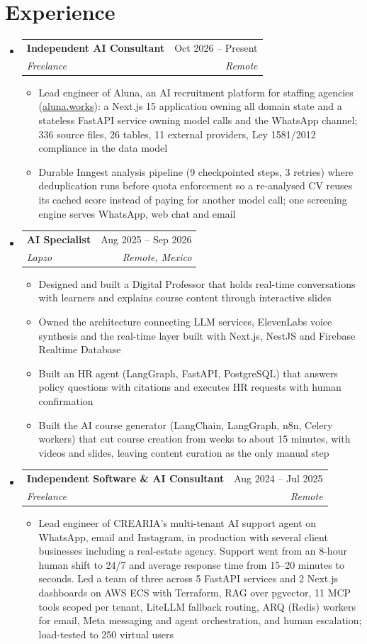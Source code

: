 \documentclass[letterpaper,10pt]{article}
\makeatletter
\newcommand{\resumeSubheading}[4]{
  \vspace{-2pt}
  \item[]
  \begin{tabular*}{\textwidth}{@{\extracolsep{\fill}}l r}
    \textbf{#1} & #2 \\
    \textit{#3} & \textit{#4} \\
  \end{tabular*}
  \vspace{-5pt}
}
\makeatother
\begin{document}
\section{Experience}
\begin{itemize}[leftmargin=0pt, itemindent=0pt, label={}, itemsep=1pt]
\resumeSubheading
{Independent AI Consultant}{Oct 2026 -- Present}
{Freelance}{Remote}
\begin{itemize}[leftmargin=*, itemsep=0pt]
    \item Lead engineer of Aluna, an AI recruitment platform for staffing agencies (\href{https://www.aluna.works}{aluna.works}): a Next.js 15 application owning all domain state and a stateless FastAPI service owning model calls and the WhatsApp channel; 336 source files, 26 tables, 11 external providers, Ley 1581/2012 compliance in the data model
    \item Durable Inngest analysis pipeline (9 checkpointed steps, 3 retries) where deduplication runs before quota enforcement so a re-analysed CV reuses its cached score instead of paying for another model call; one screening engine serves WhatsApp, web chat and email
\end{itemize}
\resumeSubheading
{AI Specialist}{Aug 2025 -- Sep 2026}
{Lapzo}{Remote, Mexico}
\begin{itemize}[leftmargin=*, itemsep=0pt]
    \item Designed and built a Digital Professor that holds real-time conversations with learners and explains course content through interactive slides
    \item Owned the architecture connecting LLM services, ElevenLabs voice synthesis and the real-time layer built with Next.js, NestJS and Firebase Realtime Database
    \item Built an HR agent (LangGraph, FastAPI, PostgreSQL) that answers policy questions with citations and executes HR requests with human confirmation
    \item Built the AI course generator (LangChain, LangGraph, n8n, Celery workers) that cut course creation from weeks to about 15 minutes, with videos and slides, leaving content curation as the only manual step
\end{itemize}
\resumeSubheading
{Independent Software \& AI Consultant}{Aug 2024 -- Jul 2025}
{Freelance}{Remote}
\begin{itemize}[leftmargin=*, itemsep=0pt]
    \item Lead engineer of CREARIA's multi-tenant AI support agent on WhatsApp, email and Instagram, in production with several client businesses including a real-estate agency. Support went from an 8-hour human shift to 24/7 and average response time from 15--20 minutes to seconds. Led a team of three across 5 FastAPI services and 2 Next.js dashboards on AWS ECS with Terraform, RAG over pgvector, 11 MCP tools scoped per tenant, LiteLLM fallback routing, ARQ (Redis) workers for email, Meta messaging and agent orchestration, and human escalation; load-tested to 250 virtual users

\end{itemize}
\end{itemize}
\end{document}
